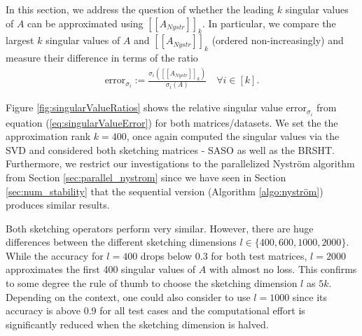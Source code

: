 \documentclass{article}
\theoremstyle{definition}
\begin{document}
In this section, we address the question of whether the leading $k$ singular values of $A$ can be approximated using $[\![A_{Nystr}]\!]_k$. In particular, we compare the largest $k$ singular values of $A$ and $[\![A_{Nystr}]\!]_k$ (ordered non-increasingly) and measure their difference in terms of the ratio
\begin{align}
    \label{eq:singularValueError}
    \text{error}_{\sigma_i} := \frac{\sigma_i([\![A_{Nystr}]\!]_k)}{\sigma_i(A)}
    \quad \forall i \in [k].
\end{align}

Figure \ref{fig:singularValueRatios} shows the relative singular value $\text{error}_{\sigma_i}$ from equation (\ref{eq:singularValueError}) for both matrices/datasets. We set the the approximation rank $k=400$, once again computed the singular values via the SVD and considered both sketching matrices - SASO as well as the BRSHT. Furthermore, we restrict our investigations to the parallelized Nyström algorithm from Section \ref{sec:parallel_nystrom} since we have seen in Section \ref{sec:num_stability} that the sequential version (Algorithm \ref{algo:nyström}) produces similar results.

Both sketching operators perform very similar. However, there are huge differences between the different sketching dimensions $l \in \{400, 600, 1000, 2000\}$. While the accuracy for $l=400$ drops below 0.3 for both test matrices, $l = 2000$ approximates the first 400 singular values of $A$ with almost no loss. This confirms to some degree the rule of thumb to choose the sketching dimension $l$ as $5k$. Depending on the context, one could also consider to use $l=1000$ since its accuracy is above 0.9 for all test cases and the computational effort is significantly reduced when the sketching dimension is halved.
\end{document}
